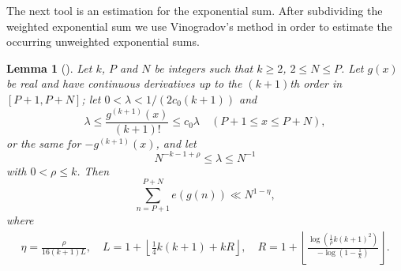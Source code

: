 \documentclass[a4paper,10pt]{amsart}
\newtheorem{lem}{Lemma}[section]
\numberwithin{equation}{section}
\theoremstyle{definition}
\theoremstyle{remark}
\newtheorem{rem}[lem]{Remark}
\newcommand{\lf}{\left\lfloor}
\newcommand{\rf}{\right\rfloor}
\renewcommand{\lvert}{\left\vert}
\renewcommand{\rvert}{\right\vert}
\begin{document}


The next tool is an estimation for the exponential sum. After subdividing the
weighted exponential sum we use Vinogradov's method in order to estimate the
occurring unweighted exponential sums.

\begin{lem}[{\cite[Lemma 6]{Nakai_Shiokawa1990:class_normal_numbers}}]
\label{nakshi:lem6}
Let $k$, $P$ and $N$ be integers such that $k\geq2$, $2\leq N\leq P$. Let
$g(x)$ be real and have continuous derivatives up to the $(k+1)$th order in
$[P+1,P+N]$; let $0<\lambda<1/(2c_0(k+1))$ and
\[
  \lambda\leq\frac{g^{(k+1)}(x)}{(k+1)!}\leq c_0\lambda
  \quad(P+1\leq x\leq P+N),
\]
or the same for $-g^{(k+1)}(x)$, and let
\[
N^{-k-1+\rho}\leq\lambda\leq N^{-1}
\]
with $0<\rho\leq k$. Then
\[
  \sum_{n=P+1}^{P+N}e(g(n))\ll N^{1-\eta},
\]
where
\begin{gather}\label{mani:eta}
\eta=\frac{\rho}{16(k+1)L},\quad
L=1+\lf\frac14k(k+1)+kR\rf,\quad
R=1+\lf\frac{\log\left(\frac1\rho k(k+1)^2\right)}{-\log\left(1-\frac1k\right)}\rf.
\end{gather}
\end{lem}
\end{document}
